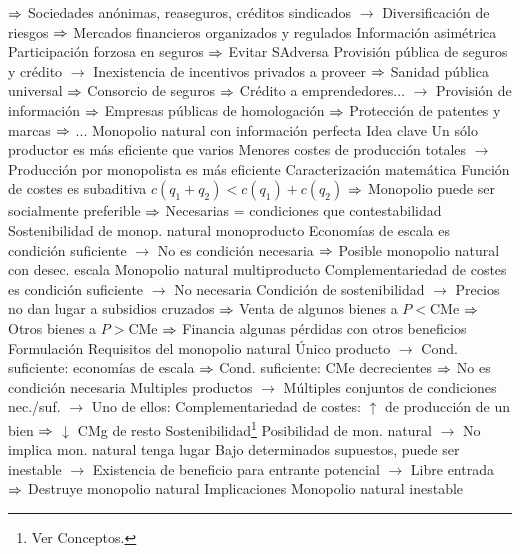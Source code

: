 \documentclass{nuevotema}
\begin{document}
\begin{esquemal}
				\4[] $\Rightarrow$ Sociedades anónimas, reaseguros, créditos sindicados
				\4[] $\to$ Diversificación de riesgos
				\4[] $\Rightarrow$ Mercados financieros organizados y regulados
				\4 Información asimétrica
				\4[] Participación forzosa en seguros
				\4[] $\Rightarrow$ Evitar SAdversa
				\4[] Provisión pública de seguros y crédito
				\4[] $\to$ Inexistencia de incentivos privados a proveer
				\4[] $\Rightarrow$ Sanidad pública universal
				\4[] $\Rightarrow$ Consorcio de seguros
				\4[] $\Rightarrow$ Crédito a emprendedores...
				\4[] $\to$ Provisión de información
				\4[] $\Rightarrow$ Empresas públicas de homologación
				\4[] $\Rightarrow$ Protección de patentes y marcas
				\4[] $\Rightarrow$ ...
		\2 Monopolio natural con información perfecta
			\3 Idea clave
				\4 Un sólo productor es más eficiente que varios
				\4[] Menores costes de producción totales
				\4[] $\to$ Producción por monopolista es más eficiente
				\4 Caracterización matemática
				\4[] Función de costes es subaditiva
				\4[] $c(q_1 + q_2) < c(q_1) + c(q_2)$
				\4[] $\Rightarrow$ Monopolio puede ser socialmente preferible
				\4[] $\Rightarrow$ Necesarias = condiciones que contestabilidad
				\4 Sostenibilidad de monop. natural monoproducto
				\4[] Economías de escala es condición suficiente
				\4[] $\to$ No es condición necesaria
				\4[] $\Rightarrow$ Posible monopolio natural con desec. escala
				\4 Monopolio natural multiproducto
				\4[] Complementariedad de costes es condición suficiente
				\4[] $\to$ No necesaria
				\4[] Condición de sostenibilidad
				\4[] $\to$ Precios no dan lugar a subsidios cruzados
				\4[] $\Rightarrow$ Venta de algunos bienes a $P<\text{CMe}$
				\4[] $\Rightarrow$ Otros bienes a $P>\text{CMe}$
				\4[] $\Rightarrow$ Financia algunas pérdidas con otros beneficios
			\3 Formulación
				\4 Requisitos del monopolio natural
				\4[] Único producto
				\4[] $\to$ Cond. suficiente: economías de escala
				\4[] $\Rightarrow$ Cond. suficiente: CMe decrecientes
				\4[] $\Rightarrow$ No es condición necesaria
				\4[] 
				\4[] Multiples productos
				\4[] $\to$ Múltiples conjuntos de condiciones nec./suf.
				\4[] $\to$ Uno de ellos:
				\4[] Complementariedad de costes:
				\4[] $\uparrow$ de producción de un bien $\Rightarrow$ $\downarrow$ CMg de resto
				\4 Sostenibilidad\footnote{Ver Conceptos.}
				\4[] Posibilidad de mon. natural
				\4[] $\to$ No implica mon. natural tenga lugar
				\4[] Bajo determinados supuestos, puede ser inestable
				\4[] $\to$ Existencia de beneficio para entrante potencial
				\4[] $\to$ Libre entrada
				\4[] $\Rightarrow$ Destruye monopolio natural
			\3 Implicaciones
				\4 Monopolio natural inestable

\end{esquemal}
\end{document}
